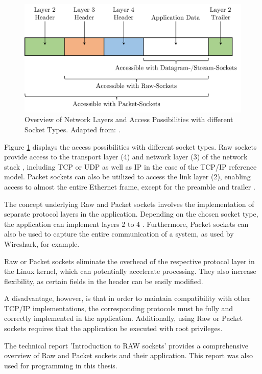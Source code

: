\begin{figure}[h]
    \centering
    \includegraphics[width=0.9\linewidth]{figures/linux_nwstack/image02.pdf}
    \caption[Overview of Network Layers and Access Possibilities with different Socket Types]{Overview of Network Layers and Access Possibilities with different Socket Types. Adapted from: \cite{sock07}.}
    \label{fig:SocketAccessPossib}
\end{figure}

Figure \ref{fig:SocketAccessPossib} displays the access possibilities with different socket types. Raw sockets provide access to the transport layer (4) and network layer (3) of the network stack \cite{sock08}, including TCP or UDP as well as IP in the case of the TCP/IP reference model. Packet sockets can also be utilized to access the link layer (2), enabling access to almost the entire Ethernet frame, except for the preamble and trailer \cite{sock09}.

The concept underlying Raw and Packet sockets involves the implementation of separate protocol layers in the application. Depending on the chosen socket type, the application can implement layers 2 to 4 \cite{sock08}. Furthermore, Packet sockets can also be used to capture the entire communication of a system, as used by Wireshark, for example.

Raw or Packet sockets eliminate the overhead of the respective protocol layer in the Linux kernel, which can potentially accelerate processing. They also increase flexibility, as certain fields in the header can be easily modified.

A disadvantage, however, is that in order to maintain compatibility with other TCP/IP implementations, the corresponding protocols must be fully and correctly implemented in the application. Additionally, using Raw or Packet sockets requires that the application be executed with root privileges.

The technical report 'Introduction to RAW sockets' \cite{sock07} provides a comprehensive overview of Raw and Packet sockets and their application. This report was also used for programming in this thesis.



